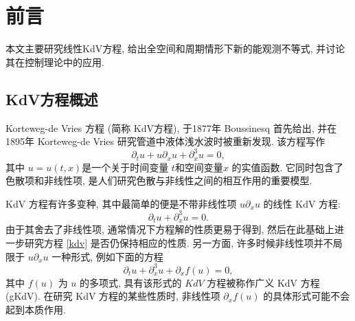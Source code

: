 \documentclass[master]{cugthesis}
\newcommand\R{\ensuremath{\mathbb{R}}}
\newcommand\T{\ensuremath{\mathbb{T}}}
\begin{document}
    \makefrontpages 
    \chapter{前言}
    本文主要研究线性KdV方程, 给出全空间和周期情形下新的能观测不等式, 并讨论其在控制理论中的应用.
    \section{KdV方程概述}
    Korteweg-de Vries 方程 (简称 KdV方程), 于1877年 Boussinesq\cite{Bouss1877} 首先给出, 并在1895年 Korteweg-de Vries \cite{Kort1895} 研究管道中液体浅水波时被重新发现. 该方程写作
    \begin{equation}
        \partial_t u +u \partial_x u +\partial_x^3 u =0,\label{kdv}
    \end{equation}
    其中 $u=u(t,x)$是一个关于时间变量 $t$和空间变量$x$ 的实值函数. 它同时包含了色散项和非线性项, 是人们研究色散与非线性之间的相互作用的重要模型.
    
    KdV 方程有许多变种, 其中最简单的便是不带非线性项 $u\partial_xu$ 的线性 KdV 方程:
    \begin{equation}
        \partial_tu+\partial_x^3u=0.
    \end{equation}
    由于其舍去了非线性项, 通常情况下方程解的性质更易于得到, 然后在此基础上进一步研究方程 \eqref{kdv} 是否仍保持相应的性质. 另一方面, 许多时候非线性项并不局限于 $u\partial_x u$ 一种形式, 例如下面的方程
    \begin{equation}
        \partial_tu +\partial_x^3u+\partial_x f(u)=0,
    \end{equation}
    其中 $f(u)$ 为 $u$ 的多项式, 具有该形式的 $KdV$ 方程被称作广义 KdV 方程(gKdV). 在研究 KdV 方程的某些性质时, 非线性项 $\partial_x f(u)$ 的具体形式可能不会起到本质作用.
    
    
   \iffalse KdV 方程的非线性项 $u\partial_x u$让它在各个函数空间中适定性的证明变得不平凡. 关于 KdV 方程在Sobolev空间 $H^s(\R)$ 和 $H^s(\T)$ 中适定性的研究, 早期的结果见 \cite{bona1975initial, kato1979cauchy,cohen1979existence,ginibre1990existence,kenig1993well}. Bourgain 在1993年发表的论文\cite{bourgain1993fourier} 中, 利用新空间 $X^{s,b}$ 有效地刻画了方程的色散特性以及它与线性方程间的偏移量, 由此证明了方程在 $s\ge 0$ 时两种空间下的局部适定性. Kenig, Ponce 和 Vega 在此结果的基础上结合他们发现的双线性估计 \cite{kenig1996bilinear}, 将局部适定性在 $\R$ 和 $\T$ 情形下的范围分别扩大到 $s\ge -\frac{3}{4}$ 和 $s\ge -\frac{1}{2}$. Bourgain 建立了\cite{bourgain1997periodic} 初值具有有界傅里叶变换的全局适定性, 证明中用到了 KdV 系统的可积性. Tao 等人用 $I$--方法证明了 $s>-\frac{3}{4}$ 的全局适定性, 并要求解映射在 $H^s$上一致连续时 $-\frac{3}{4}$ 是临界点. Guo 则给出 \cite{guo2009global} 了全空间情形 $s=-\frac{3}{4}$ 的全局适定性.
    \fi
    
\end{document}
